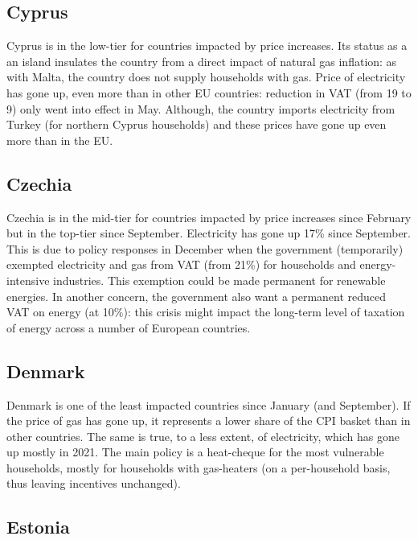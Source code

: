 \documentclass[
  9pt,
  a4paper,
  numbers=noendperiod,
  DIV=12]{scrartcl}
\begin{document}
\hypertarget{cyprus}{%
\subsection{Cyprus}\label{cyprus}}

Cyprus is in the low-tier for countries impacted by price increases. Its
status as a an island insulates the country from a direct impact of
natural gas inflation: as with Malta, the country does not supply
households with gas. Price of electricity has gone up, even more than in
other EU countries: reduction in VAT (from 19 to 9) only went into
effect in May. Although, the country imports electricity from Turkey
(for northern Cyprus households) and these prices have gone up even more
than in the EU.

\hypertarget{czechia}{%
\subsection{Czechia}\label{czechia}}

Czechia is in the mid-tier for countries impacted by price increases
since February but in the top-tier since September. Electricity has gone
up 17\% since September. This is due to policy responses in December
when the government (temporarily) exempted electricity and gas from VAT
(from 21\%) for households and energy-intensive industries. This
exemption could be made permanent for renewable energies. In another
concern, the government also want a permanent reduced VAT on energy (at
10\%): this crisis might impact the long-term level of taxation of
energy across a number of European countries.

\hypertarget{denmark}{%
\subsection{Denmark}\label{denmark}}

Denmark is one of the least impacted countries since January (and
September). If the price of gas has gone up, it represents a lower share
of the CPI basket than in other countries. The same is true, to a less
extent, of electricity, which has gone up mostly in 2021. The main
policy is a heat-cheque for the most vulnerable households, mostly for
households with gas-heaters (on a per-household basis, thus leaving
incentives unchanged).

\hypertarget{estonia}{%
\subsection{Estonia}\label{estonia}}
\end{document}
